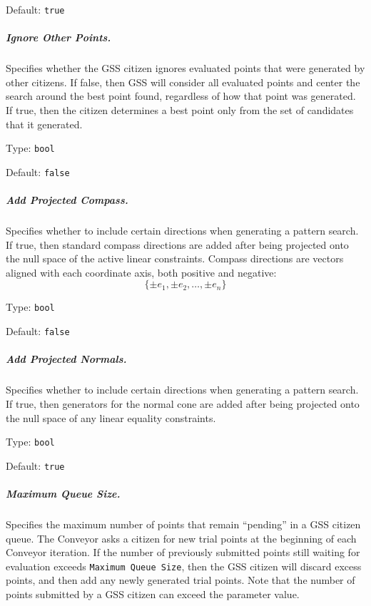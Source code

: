 \hspace{0.2in}
Default: {\tt true}

\subparagraph{Ignore Other Points.}  \label{param:GS-ignore}
Specifies whether the GSS citizen ignores evaluated points that were
generated by other citizens.  If false, then GSS will consider all
evaluated points and center the search around the best point found, regardless
of how that point was generated.  If true, then the citizen determines a best
point only from the set of candidates that it generated.

\hspace{0.2in}
Type: {\tt bool}

\hspace{0.2in}
Default: {\tt false}

\subparagraph{Add Projected Compass.}  \label{param:GS-addcompass}
Specifies whether to include certain directions when generating
a pattern search.  If true, then standard compass directions are added after
being projected onto the null space of the active linear constraints.
Compass directions are vectors aligned with each coordinate axis, both
positive and negative:
\[
  \{ \pm e_1, \pm e_2, \ldots, \pm e_n \}
\]

\hspace{0.2in}
Type: {\tt bool}

\hspace{0.2in}
Default: {\tt false}

\subparagraph{Add Projected Normals.}  \label{param:GS-addnormals}
Specifies whether to include certain directions when generating
a pattern search.  If true, then generators for the normal cone are added after
being projected onto the null space of any linear equality constraints.

\hspace{0.2in}
Type: {\tt bool}

\hspace{0.2in}
Default: {\tt true}

\subparagraph{Maximum Queue Size.}  \label{param:GS-maxq}
Specifies the maximum number of points that remain ``pending'' in a GSS citizen
queue.  The Conveyor asks a citizen for new trial points at the beginning of
each Conveyor iteration.  If the number of previously submitted points still
waiting for evaluation exceeds {\tt Maximum Queue Size}, then the GSS citizen
will discard excess points, and then add any newly generated trial points.
Note that the number of points submitted by a GSS citizen can exceed
the parameter value.

